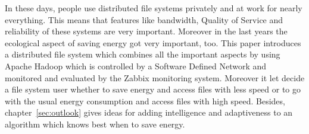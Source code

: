 In these days, people use distributed file systems privately and at work for nearly everything. This means that features like bandwidth, Quality of Service and reliability of these systems are very important. Moreover in the last years the ecological aspect of saving energy got very important, too. This paper introduces a distributed file system which combines all the important aspects by using Apache Hadoop which is controlled by a Software Defined Network and monitored and evaluated by the Zabbix monitoring system. Moreover it let decide a file system user whether to save energy and access files with less speed or to go with the usual energy consumption and access files with high speed. Besides, chapter~\ref{sec:outlook} gives ideas for adding intelligence and adaptiveness to an algorithm which knows best when to save energy.